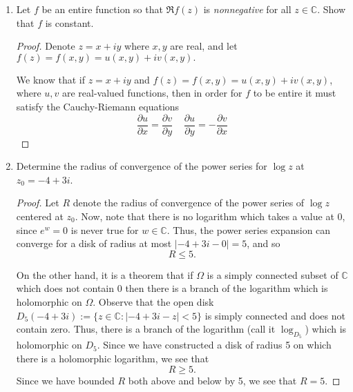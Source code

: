\documentclass{article}
\begin{document}
\begin{enumerate}
	\item Let $f$ be an entire function so that $\Re f(z)$ is \textit{nonnegative} for all $z \in \mathbb{C}$. Show that $f$ is constant.
	
	\begin{proof}
		Denote $z = x+iy$ where $x,y$ are real, and let
		$f(z) = f(x,y) = u(x,y) + i v(x,y).$
		
		We know that if $z = x+iy$ and $f(z) = f(x,y) = u(x,y) + i v(x,y)$, where $u,v$ are real-valued functions, then in order for $f$ to be entire it
		must satisfy the Cauchy-Riemann equations
		\[ \frac{\partial u}{\partial x} = \frac{\partial v}{\partial y} \; \; \; \; \frac{\partial u}{\partial y} = - \frac{\partial v}{\partial x} \]
	\end{proof}
	
	\setcounter{enumi}{5}
	\item Determine the radius of convergence of the power series for $\log z$ at $z_0 = -4 + 3i$.
	
	\begin{proof}
		Let $R$ denote the radius of convergence of the power series of $\log z$ centered at $z_0$.
		Now, note that there is no logarithm which takes a value at $0$, since $e^w = 0$ is never true for $w \in \mathbb{C}$.
		Thus, the power series expansion can converge for a disk of radius at most $|-4+3i - 0| = 5$, and so 
		\[ R \leq 5.\]
		
		On the other hand, it is a theorem that if $\Omega$ is a simply connected subset of 
		$\mathbb{C}$ which does not contain $0$ then there is a branch of the logarithm which is holomorphic on $\Omega$. Observe that the open disk $D_{5}(-4+3i) := \{ z \in \mathbb{C} : |-4+3i - z | < 5\}$ is simply connected and does not contain zero. Thus, there is a branch of the logarithm (call it $\log_{D_5}$) which is holomorphic on $D_5$. Since we have constructed a disk of radius 5 on which there is a holomorphic logarithm, we see that 
		\[ R \geq 5.\]
		Since we have bounded $R$ both above and below by 5, we see that $R=5$.		
	\end{proof}
	
\end{enumerate}
\end{document}
